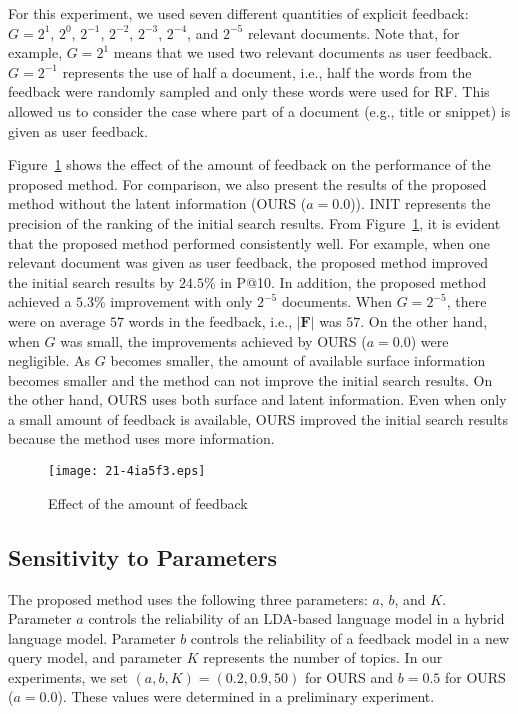 \documentclass[english]{jnlp_1.4_rep}
\begin{document}
For this experiment, we used seven different quantities of explicit
feedback: $G = 2^{1}$, $2^{0}$, $2^{-1}$, $2^{-2}$, $2^{-3}$, $2^{-4}$,
and $2^{-5}$ relevant documents. Note that, for example, $G = 2^{1}$
means that we used two relevant documents as user feedback. $G = 2^{-1}$
represents the use of half a document, i.e., half the words from the
feedback were randomly sampled and only these words were used for
RF. This allowed us to consider the case where part of a document (e.g.,
title or snippet) is given as user feedback.

Figure~\ref{fig:g} shows the effect of the amount of feedback on the
performance of the proposed method. For comparison, we also present the
results of the proposed method without the latent information (OURS ($a
= 0.0$)). INIT represents the precision of the ranking of the initial
search results. From Figure~\ref{fig:g}, it is evident that the proposed
method performed consistently well. For example, when one relevant
document was given as user feedback, the proposed method improved the
initial search results by $24.5\%$ in P@10. In addition, the proposed
method achieved a $5.3\%$ improvement with only $2^{-5}$ documents. When
$G = 2^{-5}$, there were on average $57$ words in the feedback, i.e.,
$|\bm{F}|$ was $57$. On the other hand, when $G$ was small, the
improvements achieved by OURS ($a = 0.0$) were negligible. As $G$
becomes smaller, the amount of available surface information becomes
smaller and the method can not improve the initial search results. On
the other hand, OURS uses both surface and latent information. Even when
only a small amount of feedback is available, OURS improved the initial
search results because the method uses more information.

\begin{figure}[t]
 \begin{center}
  \texttt{[image: 21-4ia5f3.eps]}
 \end{center}
  \caption{Effect of the amount of feedback}
\label{fig:g}
\end{figure}


\subsection{Sensitivity to Parameters}
\label{ssec:experiment0}

The proposed method uses the following three parameters: $a$, $b$, and
$K$. Parameter $a$ controls the reliability of an LDA-based language
model in a hybrid language model. Parameter $b$ controls the reliability
of a feedback model in a new query model, and parameter $K$ represents
the number of topics. In our experiments, we set $(a, b, K) = (0.2, 0.9,
50)$ for OURS and $b = 0.5$ for OURS ($a = 0.0$). These values were
determined in a preliminary experiment.
\end{document}
